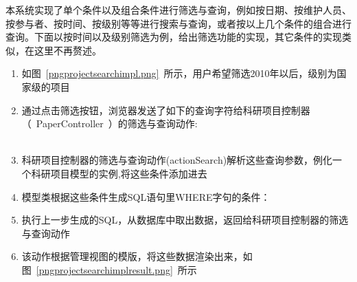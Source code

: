 本系统实现了单个条件以及组合条件进行筛选与查询，例如按日期、按维护人员、按参与者、按时间、按级别等等进行搜索与查询，或者按以上几个条件的组合进行查询。下面以按时间以及级别筛选为例，给出筛选功能的实现，其它条件的实现类似，在这里不再赘述。

\begin{enumerate}
\item 如图~\ref{pngprojectsearchimpl.png}~所示，用户希望筛选2010年以后，级别为国家级的项目
\item 通过点击筛选按钮，浏览器发送了如下的查询字符给科研项目控制器（~PaperController~）的筛选与查询动作:\\
\noindent
\ttfamily
{}\hlkwa{$>$}\hlstd{}\hlstd{{-}}\hlstd{{-}}\hspace*{\fill}\\
\hlstd{}\hspace*{\fill}
\mbox{}
\normalfont
\normalsize
\item 科研项目控制器的筛选与查询动作(actionSearch)解析这些查询参数，例化一个科研项目模型的实例,将这些条件添加进去
\item 模型类根据这些条件生成SQL语句里WHERE字句的条件：\\
\noindent
\ttfamily
{}\hlkwa{$>$}\hlstd{{-}}\hlstd{{-}}\hspace*{\fill}
\mbox{}
\normalfont
\normalsize
\item 执行上一步生成的SQL，从数据库中取出数据，返回给科研项目控制器的筛选与查询动作
\item 该动作根据管理视图的模版，将这些数据渲染出来，如图~\ref{pngprojectsearchimplresult.png}~所示
\end{enumerate} 


